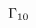 \documentclass[10pt]{amsart}
\theoremstyle{break}
\begin{document}
\begin{figure}[hbt]
\begin{equation*}
\xymatrix{

\unitlength 0.1in
\begin{picture}(6.05,9.00)(2.00,-10.00)
\special{pn 8}\special{pa 400 800}\special{pa 405 832}\special{pa 422 861}\special{pa 449 885}\special{pa 482 898}\special{pa 517 898}\special{pa 550 885}\special{pa 577 862}\special{pa 595 833}\special{pa 600 801}\special{pa 600 289}\special{pa 591 258}\special{pa 569 230}\special{pa 540 210}\special{pa 506 200}\special{pa 472 205}\special{pa 440 222}\special{pa 416 247}\special{pa 402 278}\special{pa 400 300}\special{sp}\special{pn 8}\special{pa 400 600}\special{pa 400 500}\special{fp}\special{pn 8}\special{pa 200 600}\special{pa 200 500}\special{fp}\special{pn 8}\special{pa 200 800}\special{pa 200 832}\special{pa 200 864}\special{pa 200 896}\special{pa 207 928}\special{pa 225 958}\special{pa 251 982}\special{pa 282 997}\special{pa 315 1000}\special{pa 699 1000}\special{pa 731 992}\special{pa 760 973}\special{pa 784 946}\special{pa 798 915}\special{pa 800 883}\special{pa 800 211}\special{pa 796 179}\special{pa 780 148}\special{pa 755 122}\special{pa 724 105}\special{pa 692 100}\special{pa 308 100}\special{pa 276 105}\special{pa 246 122}\special{pa 221 148}\special{pa 204 178}\special{pa 200 210}\special{pa 200 242}\special{pa 200 274}\special{pa 200 300}\special{sp}\special{sh 1}\special{pa 600 420}\special{pa 620 353}\special{pa 600 367}\special{pa 580 353}\special{pa 600 420}\special{fp}\special{sh 1}\special{pa 800 420}\special{pa 820 353}\special{pa 800 367}\special{pa 780 353}\special{pa 800 420}\special{fp}\special{pn 8}\special{pa 400 600}\special{pa 393 626}\special{pa 365 638}\special{pa 325 641}\special{pa 300 640}\special{sp}\special{pn 8}\special{pa 200 600}\special{pa 207 626}\special{pa 235 638}\special{pa 275 641}\special{pa 300 640}\special{sp}\special{pn 8}\special{pa 400 800}\special{pa 393 774}\special{pa 365 762}\special{pa 325 759}\special{pa 300 760}\special{sp}\special{pn 8}\special{pa 200 800}\special{pa 207 774}\special{pa 235 762}\special{pa 275 759}\special{pa 300 760}\special{sp}\special{pn 8}\special{pa 290 760}\special{pa 290 640}\special{fp}\special{pn 8}\special{pa 400 500}\special{pa 397 468}\special{pa 387 437}\special{pa 380 406}\special{pa 384 375}\special{pa 393 344}\special{pa 400 312}\special{pa 400 300}\special{sp}\special{pn 8}\special{pa 200 500}\special{pa 203 468}\special{pa 213 437}\special{pa 220 406}\special{pa 216 375}\special{pa 207 344}\special{pa 200 312}\special{pa 200 300}\special{sp}\special{pn 8}\special{pa 310 760}\special{pa 310 640}\special{fp}\put(5.00,-11.0000){\makebox(0,0){$\Gamma_{10}$}}\end{picture}
}
\end{equation*}
\end{figure}
\end{document}
